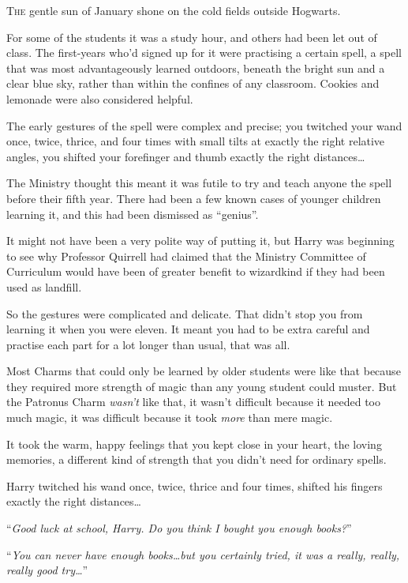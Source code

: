 
\lettrine{T}{he} gentle sun of January shone on the cold fields outside Hogwarts.

For some of the students it was a study hour, and others had been let out of class. The first-years who’d signed up for it were practising a certain spell, a spell that was most advantageously learned outdoors, beneath the bright sun and a clear blue sky, rather than within the confines of any classroom. Cookies and lemonade were also considered helpful.

The early gestures of the spell were complex and precise; you twitched your wand once, twice, thrice, and four times with small tilts at exactly the right relative angles, you shifted your forefinger and thumb exactly the right distances…

The Ministry thought this meant it was futile to try and teach anyone the spell before their fifth year. There had been a few known cases of younger children learning it, and this had been dismissed as “genius”.

It might not have been a very polite way of putting it, but Harry was beginning to see why Professor Quirrell had claimed that the Ministry Committee of Curriculum would have been of greater benefit to wizardkind if they had been used as landfill.

So the gestures were complicated and delicate. That didn’t stop you from learning it when you were eleven. It meant you had to be extra careful and practise each part for a lot longer than usual, that was all.

Most Charms that could only be learned by older students were like that because they required more strength of magic than any young student could muster. But the Patronus Charm \emph{wasn’t} like that, it wasn’t difficult because it needed too much magic, it was difficult because it took \emph{more} than mere magic.

It took the warm, happy feelings that you kept close in your heart, the loving memories, a different kind of strength that you didn’t need for ordinary spells.

Harry twitched his wand once, twice, thrice and four times, shifted his fingers exactly the right distances…

“\emph{Good luck at school, Harry. Do you think I bought you enough books?}”

“\emph{You can never have enough books…but you certainly tried, it was a really, really, really good try…}”

